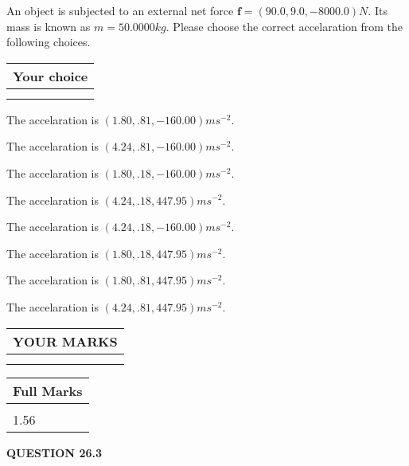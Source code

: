 \documentclass[12pt]{article}
\begin{document}
  
 
 
An object is subjected to an external net force $\mathbf{f}=
(90.0 , 9.0 , -8000.0) N$.
Its mass is known as $m= %
50.0000 kg$. Please choose the
correct accelaration from the following choices.
 
  
  
\noindent\hspace{3.0in} \begin{tabular}{|l|}
\hline
Your choice \\
\hline
 \\ 
 \\ 
\hline
\end{tabular}
  
  
 
 
The accelaration is $  %
(
1.80,
.81,
-160.00)
ms^{-2} $.
 
 
The accelaration is $  %
(
4.24,
.81,
-160.00)
ms^{-2} $.
 
 
The accelaration is $  %
(
1.80,
.18,
-160.00)
ms^{-2} $.
 
 
The accelaration is $  %
(
4.24,
.18,
447.95)
ms^{-2} $.
 
 
The accelaration is $  %
(
4.24,
.18,
-160.00)
ms^{-2} $.
 
 
The accelaration is $  %
(
1.80,
.18,
447.95)
ms^{-2} $.
 
 
The accelaration is $  %
(
1.80,
.81,
447.95)
ms^{-2} $.
 
 
The accelaration is $  %
(
4.24,
.81,
447.95)
ms^{-2} $.
 
 
 

 

 
\vspace{0.3in}
  
\vspace{0.2in}
  
\noindent\begin{tabular}{|l|}
\hline
 YOUR MARKS  \\
\hline
 \\ 
 \\ 
\hline
\end{tabular}
\hspace{0.05in} \begin{tabular}{|l|}
\hline
 Full Marks  \\
\hline
 \\ 
1.56 \\
\hline
\end{tabular}
{\textbf{\Large{QUESTION
26.3 
}}}
  
\end{document}
